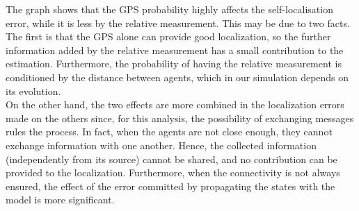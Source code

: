 The graph shows that the GPS probability highly affects the self-localisation error, while it is less by the relative measurement. This may be due to two facts. The first is that the GPS alone can provide good localization, so the further information added by the relative measurement has a small contribution to the estimation. Furthermore, the probability of having the relative measurement is conditioned by the distance between agents, which in our simulation depends on its evolution.\\
On the other hand, the two effects are more combined in the localization errors made on the others since, for this analysis, the possibility of exchanging messages rules the process. In fact, when the agents are not close enough, they cannot exchange information with one another. Hence, the collected information (independently from its source) cannot be shared, and no contribution can be provided to the localization. Furthermore, when the connectivity is not always ensured, the effect of the error committed by propagating the states with the model is more significant.